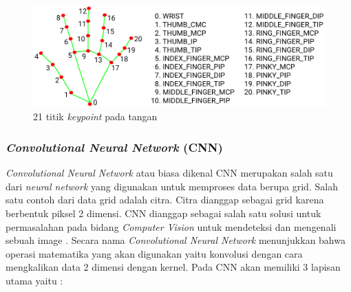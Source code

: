 \begin{figure}[!h]
  \centering
	\includegraphics[width=1\linewidth]{gambar/hand_landmarks.png}
	\caption{21 titik \textit{keypoint} pada tangan \parencite{mediapipe}}
	\label{fig:tangan}
\end{figure}

\subsubsection{\textit{Convolutional Neural Network} (CNN)}
\textit{Convolutional Neural Network} atau biasa dikenal CNN merupakan salah satu dari \textit{neural network} yang digunakan untuk memproses data berupa grid. Salah satu contoh dari data grid adalah citra. Citra dianggap sebagai grid karena berbentuk piksel 2 dimensi. CNN dianggap sebagai salah satu solusi untuk permasalahan pada bidang \textit{Computer Vision} untuk mendeteksi dan mengenali sebuah image \parencite{CNN}. Secara nama \textit{Convolutional Neural Network} menunjukkan bahwa operasi matematika yang akan digunakan yaitu konvolusi dengan cara mengkalikan data 2 dimensi dengan kernel. Pada CNN akan memiliki 3 lapisan utama yaitu :
